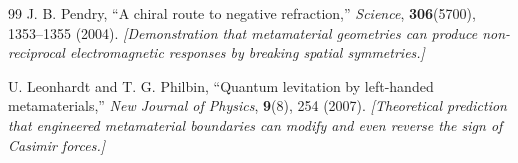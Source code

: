\documentclass[11pt, letterpaper]{article}
\theoremstyle{definition}
\theoremstyle{remark}
\begin{document}
\begin{thebibliography}{99}
J. B. Pendry,
``A chiral route to negative refraction,''
\textit{Science}, \textbf{306}(5700), 1353--1355 (2004).
\newblock \textit{[Demonstration that metamaterial geometries can produce non-reciprocal electromagnetic responses by breaking spatial symmetries.]}

U. Leonhardt and T. G. Philbin,
``Quantum levitation by left-handed metamaterials,''
\textit{New Journal of Physics}, \textbf{9}(8), 254 (2007).
\newblock \textit{[Theoretical prediction that engineered metamaterial boundaries can modify and even reverse the sign of Casimir forces.]}

\end{thebibliography}
\end{document}
